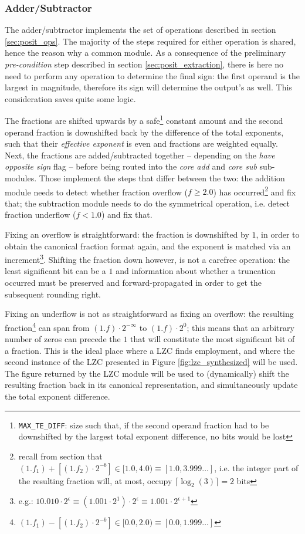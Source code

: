 \subsubsection{Adder/Subtractor}

The adder/subtractor implements the set of operations described in section \ref{sec:posit_ops}. The majority of the steps required for either operation is shared, hence the reason why a common module.
As a consequence of the preliminary \textit{pre-condition} step described in section \ref{sec:posit_extraction}, there is here no need to perform any operation to determine the final sign: the first operand is the largest in magnitude, therefore its sign will determine the output's as well. This consideration saves quite some logic.

The fractions are shifted upwards by a safe\footnote{\texttt{MAX\_TE\_DIFF}: size such that, if the second operand fraction had to be downshifted by the largest total exponent difference, no bits would be lost} constant amount and the second operand fraction is downshifted back by the difference of the total exponents, such that their \textit{effective exponent} is even and fractions are weighted equally.
Next, the fractions are added/subtracted together -- depending on the \textit{have opposite sign} flag -- before being routed into the \textit{core add} and \textit{core sub} sub-modules. Those implement the steps that differ between the two: the addition module needs to detect whether fraction overflow ($f \ge 2.0$) has occurred\footnote{recall from section that $(1.f_1) + [(1.f_2) \cdot 2^{-b}] \in [1.0, 4.0) \equiv [1.0, 3.999\dots]$, i.e. the integer part of the resulting fraction will, at most, occupy $\lceil\log_2(3)\rceil = 2$ bits} and fix that; the subtraction module needs to do the symmetrical operation, i.e. detect fraction underflow ($f < 1.0$) and fix that.

Fixing an overflow is straightforward: the fraction is downshifted by $1$, in order to obtain the canonical fraction format again, and the exponent is matched via an increment\footnote{e.g.: $10.010 \cdot 2^{\epsilon} \equiv (1.001 \cdot 2^1) \cdot 2^{\epsilon} \equiv 1.001 \cdot 2^{\epsilon + 1}$}. Shifting the fraction down however, is not a carefree operation: the least significant bit can be a $1$ and information about whether a truncation occurred must be preserved and forward-propagated in order to get the subsequent rounding right.

Fixing an underflow is not as straightforward as fixing an overflow:
the resulting fraction\footnote{$(1.f_1) - [(1.f_2) \cdot 2^{-b}] \in [0.0, 2.0) \equiv [0.0, 1.999\dots]$} can span from
$(1.f) \cdot 2^{-\infty}$ to $(1.f) \cdot 2^{0}$; this means that an arbitrary number of zeros can precede the $1$ that will constitute the most significant bit of a fraction.
This is the ideal place where a LZC finds employment, and where the second instance of the LZC presented in Figure \ref{fig:lzc_synthesized} will be used.
The figure returned by the LZC module will be used to (dynamically) shift the resulting fraction back in its canonical representation, and simultaneously update the total exponent difference.

